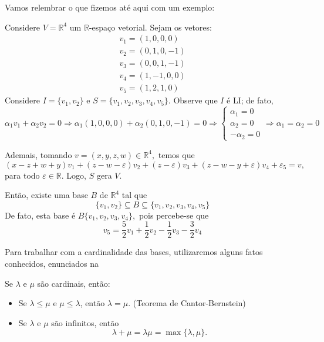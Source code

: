 \documentclass[11pt,twoside,a4paper]{book}
\begin{document}
Vamos relembrar o que fizemos até aqui com um exemplo:
\begin{exemplo}
Considere $V = \mathbb{R}^4$ um $\mathbb{R}$-espaço vetorial. Sejam os vetores:
\[
\begin{array}{l}
v_1 = (1,0,0,0) \\
v_2 = (0,1,0,-1) \\
v_3 = (0,0,1,-1) \\
v_4 = (1,-1,0,0) \\
v_5 = (1,2,1,0) 
\end{array}
\]
Considere $I = \{ v_1, v_2 \}$ e $S  =\{ v_1,v_2,v_3,v_4,v_5 \}.$ Observe que $I$ é LI; de fato,
\[
\alpha_1v_1 + \alpha_2v_2 = 0 \Rightarrow \alpha_1(1,0,0,0) + \alpha_2 (0,1,0,-1) = 0 \Rightarrow \left\{ \begin{array}{l} \alpha_1 = 0 \\ \alpha_2 = 0 \\ - \alpha_2 = 0 \end{array} \right. \Rightarrow \alpha_1 = \alpha_2 = 0
\]

Ademais, tomando $v = (x,y,z,w) \in \mathbb{R}^4,$ temos que
\[
(x-z+w+y)v_1 + (z- w - \varepsilon)v_2 + (z - \varepsilon)v_3 + (z-w-y + \varepsilon)v_4 + \varepsilon_5 = v,
\]
para todo $\varepsilon \in \mathbb{R}.$ Logo, $S$ gera $V.$ 

Então, existe uma base $B$ de $\mathbb{R}^4$ tal que 
\[
\{ v_1, v_2 \} \subseteq B \subseteq \{v_1,v_2,v_3,v_4,v_5 \}
\]
De fato, esta base é $B \{v_1, v_2, v_3, v_4 \},$ pois percebe-se que
\[
v_5 = \frac{5}{2}v_1 + \frac{1}{2} v_2 - \frac{1}{2}v_3 - \frac{3}{2} v_4
\]
\end{exemplo}




Para trabalhar com a cardinalidade das bases, utilizaremos alguns fatos conhecidos, enunciados na
\begin{proposicao}
Se $\lambda$ e $\mu$ são cardinais, então:
\begin{itemize}
\item Se $\lambda\leq\mu$ e $\mu\leq\lambda$, então $\lambda=\mu$. (Teorema de Cantor-Bernstein)
\item Se $\lambda$ e $\mu$ são infinitos, então \[\lambda+\mu=\lambda\mu=\max\{\lambda,\mu\}.\]
\end{itemize}
\end{proposicao}
\end{document}
